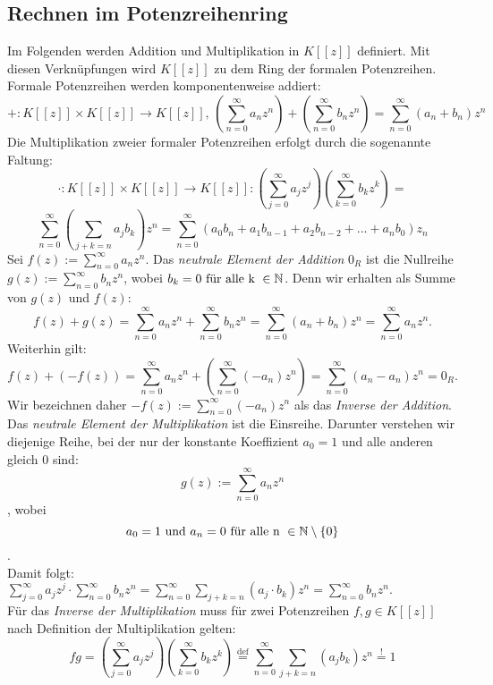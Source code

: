 \subsection{Rechnen im Potenzreihenring} \label{Rechnen}
Im Folgenden werden Addition und Multiplikation in $K[[z]]$ definiert. Mit diesen Verknüpfungen wird $K[[z]]$ zu dem Ring der formalen Potenzreihen. \\
Formale Potenzreihen werden komponentenweise addiert: 
%
\[
+: K [[z]] \times K [[z]] \to K[[z]] \text{, } \left( \sum_{n=0}^\infty a_n z^n \right) + \left( \sum_{n=0}^\infty b_n z^n \right) = \sum_{n=0}^{\infty} (a_n + b_n) z^n 
\]
%
Die Multiplikation zweier formaler Potenzreihen erfolgt durch die sogenannte Faltung:
\[
\cdot:  K [[z]] \times K [[z]] \to K[[z]]: \left( \sum_{j=0}^\infty a_j z^j \right) \left( \sum_{k=0}^\infty b_k z^k \right) = \]\[\sum_{n=0}^\infty \left(\sum_{j+k=n} a_j b_k\right) z^n = \sum_{n= 0}^\infty \left(a_0b_n + a_1b_{n-1} + a_2b_{n-2} + ... + a_nb_0 \right)z_n
\]
%
\vspace{0.8cm}
 Sei $ f(z) := \sum_{n=0}^\infty  a_n z^n$. Das \textit{neutrale Element der Addition} $0_R$ ist die Nullreihe $ g(z) := \sum_{n=0}^\infty  b_n z^n$, wobei $b_k= 0 \text{ für alle k } \in \mathbb{N} $. Denn wir erhalten als Summe von $g(z)$ und $f(z)$: 
 \[ f(z) + g(z)= \sum_{n=0}^\infty a_nz^n + \sum_{n=0}^\infty b_nz^n = \sum_{n=0}^\infty \left(a_n+b_n\right)z^n = \sum_{n=0}^\infty a_nz^n.\]
 Weiterhin gilt: 
 \[f(z) + (-f(z)) = \sum_{n=0}^\infty  a_nz^n + (\sum_{n=0}^\infty  (-a_n)z^n) = \sum_{n=0}^{\infty}(a_n-a_n)z^n = 0_R. \]
 Wir bezeichnen daher $ -f(z) := \sum_{n=0}^\infty  (-a_n)z^n$ als das \textit{Inverse der Addition}.\\
 Das \textit{neutrale Element der Multiplikation} ist die Einsreihe. Darunter verstehen wir diejenige Reihe, bei der nur der konstante Koeffizient $a_0 = 1$ und alle anderen gleich 0 sind: 
 \[ g(z) := \sum_{n=0}^\infty  a_nz^n\], wobei \[a_0 = 1 \text{ und } a_n = 0 \text{ für alle n } \in \mathbb{N}\setminus\lbrace 0\rbrace \].\\ 
Damit folgt: $ \sum_{j=0}^\infty a_jz^j \cdot \sum_{n=0}^\infty b_nz^n = \sum_{n=0}^\infty \sum_{j+k=n} \left(a_j\cdot b_k\right)z^n = \sum_{n=0}^\infty b_nz^n. $\\ 
Für das \textit{Inverse der Multiplikation} muss für zwei Potenzreihen $f, g \in K[[z]]$ nach Definition der Multiplikation gelten:
\[
fg = \left( \sum_{j=0}^\infty a_j z^j \right) \left( \sum_{k=0}^\infty b_k z^k \right)  
\stackrel{\mathrm{def}}= \sum_{n=0}^\infty\sum_{j+k=n} (a_j b_k) z^n \stackrel{\mathrm{!}}= 1\]
